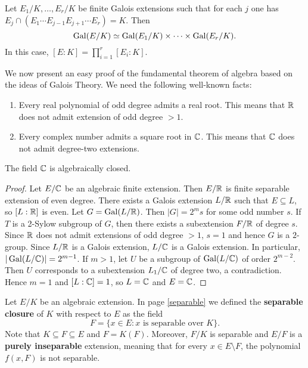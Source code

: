 \begin{exercise}
    Let $E_1/K,\dots,E_r/K$ be finite Galois extensions such that for each $j$ 
    one has $E_j\cap (E_1\cdots E_{j-1}E_{j+1}\cdots E_r)=K$. Then 
    \[
    \operatorname{Gal}(E/K)\simeq\operatorname{Gal}(E_1/K)\times\cdots\times\operatorname{Gal}(E_r/K).
    \]
    In this case, $[E:K]=\prod_{i=1}^r[E_i:K]$. 
\end{exercise}


We now present an easy proof of the fundamental theorem 
of algebra based on the ideas of Galois Theory. 
We need the following well-known facts:
\begin{enumerate}
\item Every real polynomial of odd degree admits a real root. This means that $\mathbb{R}$ 
does not admit extension of odd degree $>1$. 
\item Every complex number admits a square root in $\mathbb{C}$. This means that $\mathbb{C}$ 
does not admit degree-two extensions.
\end{enumerate}

\begin{theorem}
The field $\mathbb{C}$ is algebraically closed.
\end{theorem}

\begin{proof}
    Let $E/\mathbb{C}$ be an algebraic finite extension. Then $E/\mathbb{R}$ 
    is finite separable extension of even degree. There exists a Galois
    extension 
    $L/\mathbb{R}$ such that $E\subseteq L$, so $[L:\mathbb{R}]$ is even. Let $G=\operatorname{Gal}(L/\mathbb{R})$. 
    Then $|G|=2^ms$ for some odd number $s$. If $T$ is a 2-Sylow subgroup
    of $G$, 
    then there exists a subextension $F/\mathbb{R}$ of degree $s$. Since 
    $\mathbb{R}$ does not admit extensions of odd degree $>1$, $s=1$ and
    hence $G$ is a $2$-group. Since 
    $L/\mathbb{R}$ is a Galois extension, $L/\mathbb{C}$ is a Galois extension. 
    In particular, $|\operatorname{Gal}(L/\mathbb{C})|=2^{m-1}$. If $m>1$, 
    let $U$ be a subgroup of $\operatorname{Gal}(L/\mathbb{C})$ of order $2^{m-2}$. Then $U$ corresponds 
    to a subextension $L_1/\mathbb{C}$ of degree two, a contradiction. Hence $m=1$ 
    and $[L:\mathbb{C}]=1$, so $L=\mathbb{C}$ and $E=\mathbb{C}$. 
\end{proof}


Let $E/K$ be an algebraic extension. 
In page \ref{separable} we defined the 
\textbf{separable closure} of $K$ with respect to $E$ as 
the field 
\[
    F=\{x\in E:x\text{ is separable over }K\}.
\]
Note that $K\subseteq F\subseteq E$ 
and $F=K(F)$. Moreover, 
$F/K$ is separable and 
$E/F$ is a \textbf{purely inseparable} extension, meaning that
for every $x\in E\setminus F$, the polynomial $f(x,F)$ is not separable. 

